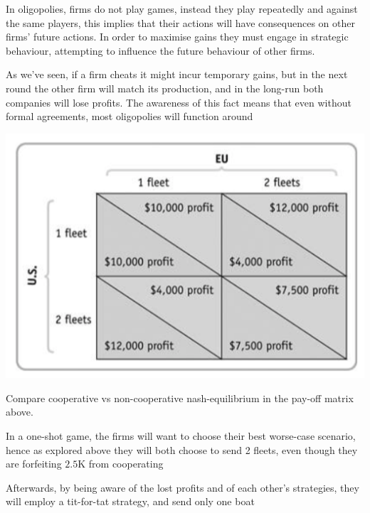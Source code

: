 \documentclass[english,course,draft]{Notes}
\begin{document}

\par{In oligopolies, firms do not play  games, instead they play repeatedly and against the same players, this implies that their actions will have consequences on other firms' future actions. In order to maximise gains they must engage in strategic behaviour, attempting to influence the future behaviour of other firms.}
\par{As we've seen, if a firm cheats it might incur temporary gains, but in the next round the other firm will match its production, and in the long-run both companies will lose profits. The awareness of this fact means that even without formal agreements, most oligopolies will function around }


\includegraphics[width=\textwidth]{g3}

\par{Compare cooperative vs non-cooperative nash-equilibrium in the pay-off matrix above.}
\par{In a one-shot game, the firms will want to choose their best worse-case scenario, hence as explored above they will both choose to send 2 fleets, even though they are forfeiting $2.5$K from cooperating}
\par{Afterwards, by being aware of the lost profits and of each other's strategies, they will employ a tit-for-tat strategy, and send only one boat}
\end{document}
